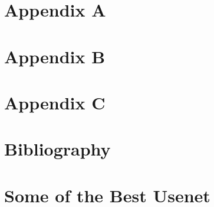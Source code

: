 \documentclass{report}
\begin{document}
    \pagestyle{plain}

    \appendix

    \chapter*{Appendix A}\label{appendix-Appendix-A}
	

    \chapter*{Appendix B}\label{appendix-Appendix-B}

    \chapter*{Appendix C}\label{appendix-Appendix-C}

    \chapter*{Bibliography}\label{appendix-Bibliography}

	\chapter*{Some of the Best Usenet}
\end{document}
